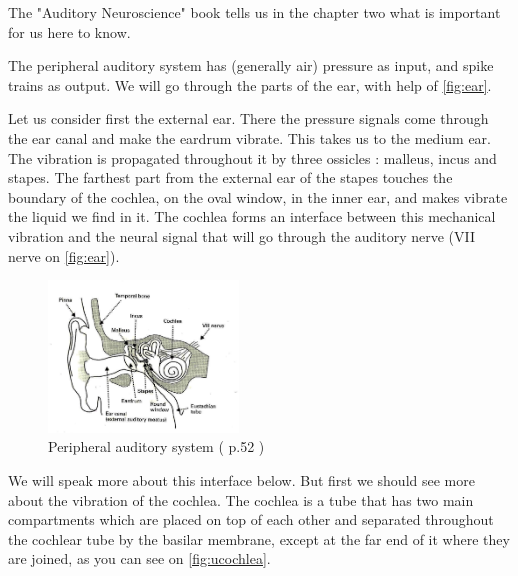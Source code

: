 The "Auditory Neuroscience" book \cite{AuditoryNeuroscience} tells us in the 
chapter two what is important for us here to know. 

The peripheral auditory system has (generally air) pressure as input, 
and spike trains as output. We will go through the parts of the ear, with help 
of \autoref{fig:ear}. 

Let us consider first the external ear. There the pressure signals come through
 the ear canal and make the eardrum vibrate. 
This takes us to the medium ear. 
The vibration is propagated throughout it by three ossicles : malleus, incus 
and stapes. The farthest part from the external ear of the stapes touches the 
boundary of the cochlea, on the oval window, in the inner ear, 
and makes vibrate the liquid we find in it. 
The cochlea forms an interface between this mechanical vibration 
and the neural signal that will go through the auditory nerve 
(VII nerve on \autoref{fig:ear}).
%


\begin{figure}[h]
	\centering
	\includegraphics[width=0.45\textwidth]{images/ear-aud52-level.jpg}
	\caption{Peripheral auditory system (\cite{AuditoryNeuroscience} p.52 )}
	\label{fig:ear}
\end{figure}

We will speak more about this interface below. But first we should see 
more about the vibration of the cochlea. 
The cochlea is a tube that has two main compartments which are placed on top of 
each other and separated throughout the cochlear tube by  
the basilar membrane,  except at the far end of it where they are joined, 
as you can see on \autoref{fig:ucochlea}.

